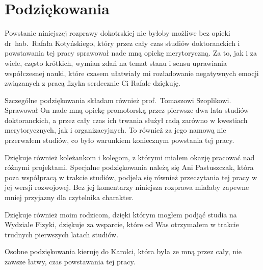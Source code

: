 \documentclass[pdflatex,11pt]{aghdpl}
\author{Marcin Stolarek}
\date{2016}
\begin{document}
\frontmatter

\titlepages

\section*{Podziękowania}
Powstanie niniejszej rozprawy dokotrskiej nie byłoby możliwe bez opieki dr~hab.~Rafała Kotyńskiego, który przez cały czas studiów doktoranckich i powstawania tej pracy sprawował nade mną opiekę merytoryczną. Za to, jak i za wiele, często krótkich, wymian zdań na temat stanu i sensu uprawiania współczesnej nauki, które czasem ułatwiały mi rozładowanie negatywnych emocji związanych z pracą fizyka serdecznie Ci Rafale dziękuję.

Szczególne podziękowania składam również prof.~Tomaszowi Szoplikowi. Sprawował On nade mną opiekę promotorską przez pierwsze dwa lata studiów doktoranckich, a przez cały czas ich trwania służył radą zarówno w kwestiach merytorycznych, jak i organizacyjnych. To również za jego namową nie przerwałem studiów, co było warunkiem koniecznym powstania tej pracy.

Dziękuje również koleżankom i kolegom, z którymi miałem okazję pracować nad różnymi projektami. Specjalne podziękowania należą się Ani Pastuszczak, która poza współpracą w trakcie studiów, podjeła się również przeczytania tej pracy w jej wersji rozwojowej. Bez jej komentarzy niniejsza rozprawa miałaby zapewne mniej przyjazny dla czytelnika charakter.

Dziękuje również moim rodzicom, dzięki którym mogłem podjąć studia na Wydziale Fizyki, dziękuje za wsparcie, które od Was otrzymałem w trakcie trudnych pierwszych latach studiów.  

Osobne podziękowania kieruję do Karolci, która była ze mną przez cały, nie zawsze łatwy, czas powstawania tej pracy.
\clearpage

\tableofcontents
\clearpage

\mainmatter


















\printnomenclature

%



\listoffigures
{}

\end{document}

